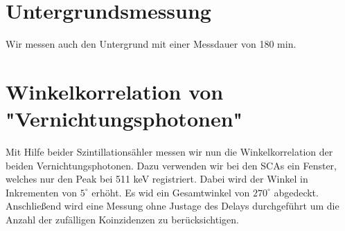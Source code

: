 \documentclass[10pt,a4paper]{article}
\begin{document}
\section{Untergrundsmessung}
Wir messen auch den Untergrund mit einer Messdauer von 180 min.
\section{Winkelkorrelation von "Vernichtungsphotonen"}
Mit Hilfe beider Szintillationsähler messen wir nun die Winkelkorrelation der beiden Vernichtungsphotonen. Dazu verwenden wir bei den SCAs ein Fenster, welches nur den Peak bei 511 keV registriert. Dabei wird der Winkel in Inkrementen von $5^\circ$ erhöht. Es wid ein Gesamtwinkel von $270^\circ$ abgedeckt. Anschließend wird eine Messung ohne Justage des Delays durchgeführt um die Anzahl der zufälligen Koinzidenzen zu berücksichtigen. 
\end{document}
